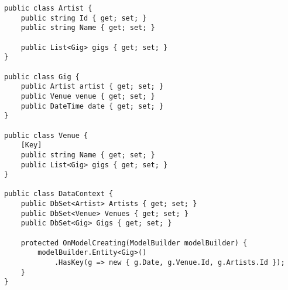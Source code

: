 \begin{lstlisting}
public class Artist {
    public string Id { get; set; }
    public string Name { get; set; }

    public List<Gig> gigs { get; set; }
}

public class Gig {
    public Artist artist { get; set; }
    public Venue venue { get; set; }
    public DateTime date { get; set; }
}

public class Venue {
    [Key]
    public string Name { get; set; }
    public List<Gig> gigs { get; set; }
}

public class DataContext {
    public DbSet<Artist> Artists { get; set; }
    public DbSet<Venue> Venues { get; set; }
    public DbSet<Gig> Gigs { get; set; }

    protected OnModelCreating(ModelBuilder modelBuilder) {
        modelBuilder.Entity<Gig>()
            .HasKey(g => new { g.Date, g.Venue.Id, g.Artists.Id });
    }
}
\end{lstlisting}